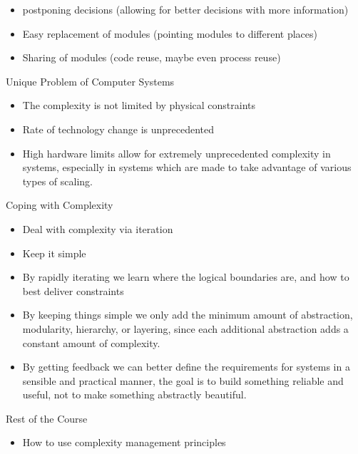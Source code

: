 \documentclass{report}
\begin{document}
\begin{description}
\begin{itemize}
\begin{itemize}
                    \item postponing decisions (allowing for better decisions with more information)
                    \item Easy replacement of modules (pointing modules to different places)
                    \item Sharing of modules (code reuse, maybe even process reuse)
                \end{itemize}
        \end{itemize}
    \item Unique Problem of Computer Systems
        \begin{itemize}
            \item The complexity is not limited by physical constraints
            \item Rate of technology change is unprecedented
            \item High hardware limits allow for extremely unprecedented complexity
                in systems, especially in systems which are made to take advantage
                of various types of scaling.
        \end{itemize}
    \item Coping with Complexity
        \begin{itemize}
            \item Deal with complexity via iteration
            \item Keep it simple
            \item By rapidly iterating we learn where the logical boundaries
                are, and how to best deliver constraints
            \item By keeping things simple we only add the minimum
                amount of abstraction, modularity, hierarchy, or layering, since
                each additional abstraction adds a constant amount of complexity.
            \item By getting feedback we can better define the requirements for systems
                in a sensible and practical manner, the goal is to build something reliable
                and useful, not to make something abstractly beautiful.
        \end{itemize}
    \item Rest of the Course
        \begin{itemize}
            \item How to use complexity management principles
                \begin{itemize}

\end{itemize}
\end{itemize}
\end{description}
\end{document}
